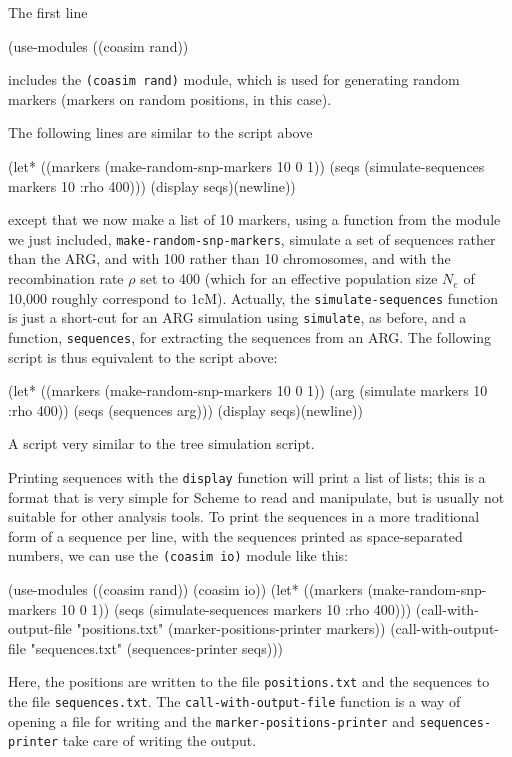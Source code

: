 \documentclass{manual}
\begin{document}
The first line
\begin{code}
(use-modules ((coasim rand))
\end{code}
includes the \texttt{(coasim rand)} module, which is used for
generating random markers (markers on random positions, in this case).

The following lines are similar to the script above
\begin{code}
(let* ((markers (make-random-snp-markers 10 0 1))
       (seqs (simulate-sequences markers 10 :rho 400)))
  (display seqs)(newline))
\end{code}
except that we now make a list of 10 markers, using a function from
the module we just included, \texttt{make-random-snp-markers},
simulate a set of sequences rather than the ARG, and with 100 rather
than 10 chromosomes, and with the recombination rate $\rho$ set to 400
(which for an effective population size $N_e$ of 10,000 roughly
correspond to 1cM).  Actually, the \texttt{simulate-sequences}
function is just a short-cut for an ARG simulation using
\texttt{simulate}, as before, and a function, \texttt{sequences}, for
extracting the sequences from an ARG.  The following script is thus
equivalent to the script above:
\begin{code}
(let* ((markers (make-random-snp-markers 10 0 1))
       (arg (simulate markers 10 :rho 400))
       (seqs (sequences arg)))
  (display seqs)(newline))
\end{code}
A script very similar to the tree simulation script.

Printing sequences with the \texttt{display} function will print a
list of lists; this is a format that is very simple for Scheme to read
and manipulate, but is usually not suitable for other analysis tools.
To print the sequences in a more traditional form of a sequence per
line, with the sequences printed as space-separated numbers, we can
use the \texttt{(coasim io)} module like this:
\begin{code}
(use-modules ((coasim rand)) (coasim io))
(let* ((markers (make-random-snp-markers 10 0 1))
       (seqs (simulate-sequences markers 10 :rho 400)))
  (call-with-output-file "positions.txt" 
    (marker-positions-printer markers))
  (call-with-output-file "sequences.txt"     
    (sequences-printer seqs)))
\end{code}
Here, the positions are written to the file \texttt{positions.txt} and
the sequences to the file \texttt{sequences.txt}.  The
\texttt{call-with-output-file} function is a way of opening a file for
writing and the \texttt{marker-positions-printer} and
\texttt{sequences-printer} take care of writing the output.
\end{document}
